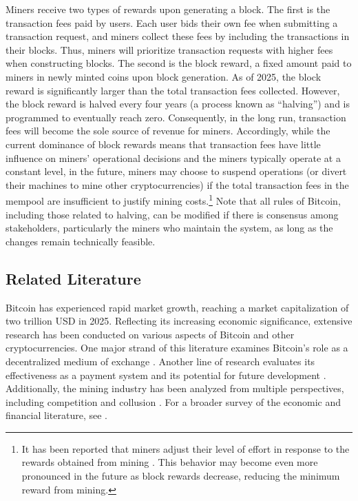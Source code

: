 \documentclass[12pt, letterpaper]{article}
\begin{document}
Miners receive two types of rewards upon generating a block. The first is the transaction fees paid by users. Each user bids their own fee when submitting a transaction request, and miners collect these fees by including the transactions in their blocks. Thus, miners will prioritize transaction requests with higher fees when constructing blocks. The second is the block reward, a fixed amount paid to miners in newly minted coins upon block generation. As of 2025, the block reward is significantly larger than the total transaction fees collected. However, the block reward is halved every four years (a process known as ``halving'') and is programmed to eventually reach zero. Consequently, in the long run, transaction fees will become the sole source of revenue for miners. Accordingly, while the current dominance of block rewards means that transaction fees have little influence on miners' operational decisions and the miners typically operate at a constant level, in the future, miners may choose to suspend operations (or divert their machines to mine other cryptocurrencies) if the total transaction fees in the mempool are insufficient to justify mining costs.\footnote{It has been reported that miners adjust their level of effort in response to the rewards obtained from mining \citep{noda2020difficulty,kawaguchi2022miners}. This behavior may become even more pronounced in the future as block rewards decrease, reducing the minimum reward from mining.} Note that all rules of Bitcoin, including those related to halving, can be modified if there is consensus among stakeholders, particularly the miners who maintain the system, as long as the changes remain technically feasible.


\subsection{Related Literature}

Bitcoin has experienced rapid market growth, reaching a market capitalization of two trillion USD in 2025. Reflecting its increasing economic significance, extensive research has been conducted on various aspects of Bitcoin and other cryptocurrencies. One major strand of this literature examines Bitcoin's role as a decentralized medium of exchange \citep{garratt2018bitcoin,schilling2019some,matsushima2020}. Another line of research evaluates its effectiveness as a payment system and its potential for future development \citep{chiu2022economics,huberman2021monopoly,budish2025trust}. Additionally, the mining industry has been analyzed from multiple perspectives, including competition and collusion \citep{cong2021decentralized,dimitri2017bitcoin,arnosti2022bitcoin,capponi2023proof,lehar2020miner}. For a broader survey of the economic and financial literature, see \citet{john2022bitcoin}.
\end{document}
